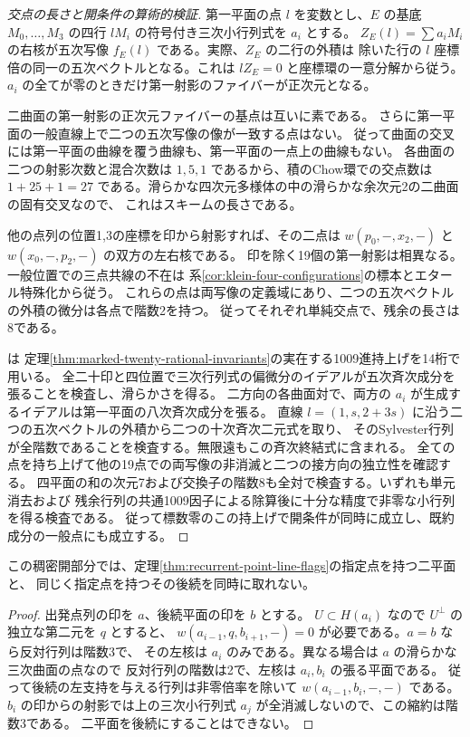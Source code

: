 \begin{proof}[交点の長さと開条件の算術的検証]
第一平面の点 $l$ を変数とし、$E$ の基底 $M_0,\ldots,M_3$ の四行 $l M_i$ の符号付き三次小行列式を $a_i$ とする。
$Z_E(l)=\sum a_i M_i$ の右核が五次写像 $f_E(l)$ である。実際、$Z_E$ の二行の外積は
除いた行の $l$ 座標倍の同一の五次ベクトルとなる。これは $lZ_E=0$ と座標環の一意分解から従う。
$a_i$ の全てが零のときだけ第一射影のファイバーが正次元となる。

二曲面の第一射影の正次元ファイバーの基点は互いに素である。
さらに第一平面の一般直線上で二つの五次写像の像が一致する点はない。
従って曲面の交叉には第一平面の曲線を覆う曲線も、第一平面の一点上の曲線もない。
各曲面の二つの射影次数と混合次数は $1,5,1$ であるから、積のChow環での交点数は
$1+25+1=27$ である。滑らかな四次元多様体の中の滑らかな余次元2の二曲面の固有交叉なので、
これはスキームの長さである。

他の点列の位置1,3の座標を印から射影すれば、その二点は
$w(p_0,-,x_2,-)$ と $w(x_0,-,p_2,-)$ の双方の左右核である。
印を除く19個の第一射影は相異なる。一般位置での三点共線の不在は
系\ref{cor:klein-four-configurations}の標本とエタール特殊化から従う。
これらの点は両写像の定義域にあり、二つの五次ベクトルの外積の微分は各点で階数2を持つ。
従ってそれぞれ単純交点で、残余の長さは8である。

 は
定理\ref{thm:marked-twenty-rational-invariants}の実在する1009進持上げを14桁で用いる。
全二十印と四位置で三次行列式の偏微分のイデアルが五次斉次成分を張ることを検査し、滑らかさを得る。
二方向の各曲面対で、両方の $a_i$ が生成するイデアルは第一平面の八次斉次成分を張る。
直線 $l=(1,s,2+3s)$ に沿う二つの五次ベクトルの外積から二つの十次斉次二元式を取り、
そのSylvester行列が全階数であることを検査する。無限遠もこの斉次終結式に含まれる。
全ての点を持ち上げて他の19点での両写像の非消滅と二つの接方向の独立性を確認する。
四平面の和の次元7および交換子の階数8も全対で検査する。いずれも単元消去および
残余行列の共通1009因子による除算後に十分な精度で非零な小行列を得る検査である。
従って標数零のこの持上げで開条件が同時に成立し、既約成分の一般点にも成立する。
\end{proof}

\begin{corollary}
この稠密開部分では、定理\ref{thm:recurrent-point-line-flags}の指定点を持つ二平面と、
同じく指定点を持つその後続を同時に取れない。
\end{corollary}
\begin{proof}
出発点列の印を $a$、後続平面の印を $b$ とする。
$U\subset H(a_i)$ なので $U^\perp$ の独立な第二元を $q$ とすると、
$w(a_{i-1},q,b_{i+1},-)=0$ が必要である。$a=b$ なら反対行列は階数3で、
その左核は $a_i$ のみである。異なる場合は $a$ の滑らかな三次曲面の点なので
反対行列の階数は2で、左核は $a_i,b_i$ の張る平面である。
従って後続の左支持を与える行列は非零倍率を除いて $w(a_{i-1},b_i,-,-)$ である。
$b_i$ の印からの射影では上の三次小行列式 $a_j$ が全消滅しないので、この縮約は階数3である。
二平面を後続にすることはできない。
\end{proof}
